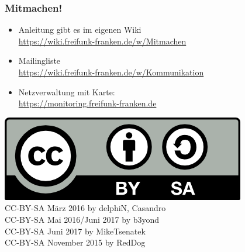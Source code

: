 \begin{frame}
\frametitle{Mitmachen!}
	\begin{itemize}
		\item Anleitung gibt es im eigenen Wiki 
			\\ \href{https://wiki.freifunk-franken.de/w/Mitmachen}{https://wiki.freifunk-franken.de/w/Mitmachen}
		\item Mailingliste 
			\\ \href{https://wiki.freifunk-franken.de/w/Kommunikation}{https://wiki.freifunk-franken.de/w/Kommunikation}
		\item Netzverwaltung mit Karte: 
			\\ \href{https://monitoring.freifunk-franken.de}{https://monitoring.freifunk-franken.de}
	\end{itemize}
	\begin{flushright}
		\includegraphics[scale=0.7]{images/CC-BY-SA.png}
		\begingroup \tiny{		
			\\CC-BY-SA März 2016 by delphiN, Casandro
			\\CC-BY-SA Mai 2016/Juni 2017 by b3yond
			\\CC-BY-SA Juni 2017 by MikeTsenatek
			\\CC-BY-SA November 2015 by RedDog}
		\endgroup
	\end{flushright}
\end{frame}